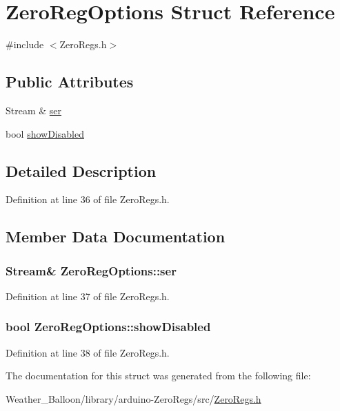 \hypertarget{struct_zero_reg_options}{}\section{Zero\+Reg\+Options Struct Reference}
\label{struct_zero_reg_options}


{\ttfamily \#include $<$Zero\+Regs.\+h$>$}

\subsection*{Public Attributes}
\begin{DoxyCompactItemize}
\item 
Stream \& \hyperlink{struct_zero_reg_options_a0935abfae59db8dd1ffedd20c2c6e88b}{ser}
\item 
bool \hyperlink{struct_zero_reg_options_ab2481a6642758da88f86fdcf9d66a8d9}{show\+Disabled}
\end{DoxyCompactItemize}


\subsection{Detailed Description}


Definition at line 36 of file Zero\+Regs.\+h.



\subsection{Member Data Documentation}
\subsubsection[{\texorpdfstring{ser}{ser}}]{\setlength{\rightskip}{0pt plus 5cm}Stream\& Zero\+Reg\+Options\+::ser}\hypertarget{struct_zero_reg_options_a0935abfae59db8dd1ffedd20c2c6e88b}{}\label{struct_zero_reg_options_a0935abfae59db8dd1ffedd20c2c6e88b}


Definition at line 37 of file Zero\+Regs.\+h.

\subsubsection[{\texorpdfstring{show\+Disabled}{showDisabled}}]{\setlength{\rightskip}{0pt plus 5cm}bool Zero\+Reg\+Options\+::show\+Disabled}\hypertarget{struct_zero_reg_options_ab2481a6642758da88f86fdcf9d66a8d9}{}\label{struct_zero_reg_options_ab2481a6642758da88f86fdcf9d66a8d9}


Definition at line 38 of file Zero\+Regs.\+h.



The documentation for this struct was generated from the following file\+:\begin{DoxyCompactItemize}
\item 
Weather\+\_\+\+Balloon/library/arduino-\/\+Zero\+Regs/src/\hyperlink{_zero_regs_8h}{Zero\+Regs.\+h}\end{DoxyCompactItemize}
